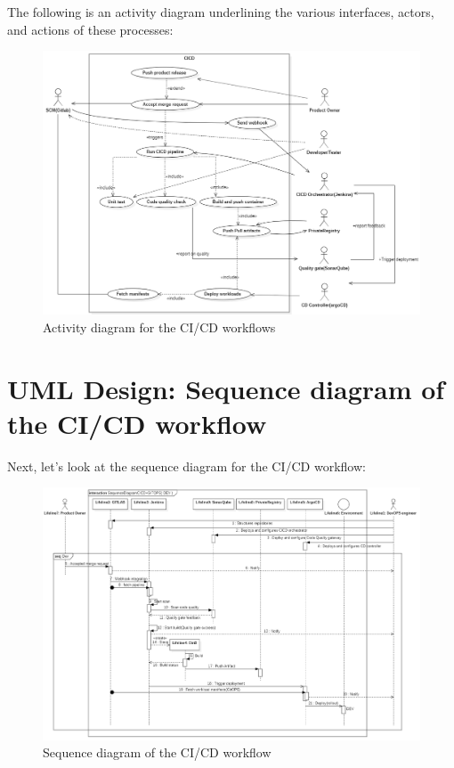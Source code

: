  

The following is an activity diagram underlining the various interfaces, actors, and actions of these processes: 

\begin{figure}[H]\centering
\includegraphics[width=1.0\textwidth,angle=00]{assets/f45.png}
\caption{ Activity diagram for the CI/CD workflows}
\label{fig:Activity diagram for the CI/CD workflows}
\end{figure}

\section{UML Design: Sequence diagram of the CI/CD workflow }

Next, let’s look at the sequence diagram for the CI/CD workflow: 
\begin{figure}[H]\centering
\includegraphics[width=1.0\textwidth,angle=00]{assets/f46.png}
\caption{ Sequence diagram of the CI/CD workflow}
\label{fig:sequence diagram of the CI/CD workflow}
\end{figure}

